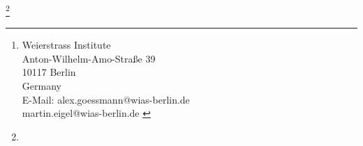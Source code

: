 \title[\ownShortTitle]
{\ownTitle}
\date{August 5, 2026} %




\author[A. Goessmann, M. Eigel]{
Alex Goessmann\nofnmark\footnote{Weierstrass Institute\\
		   			  Anton-Wilhelm-Amo-Straße 39\\
					  10117 Berlin\\
					  Germany\\ 
					  E-Mail: alex.goessmann@wias-berlin.de\\
                    \phantom{E-mail:} martin.eigel@wias-berlin.de
					  \label{refnote}},
Martin Eigel
}
\subjclass[2020]{%
\ownAMS
}
%
\keywords{\ownKeywords}
\thanks{\ownThanks}